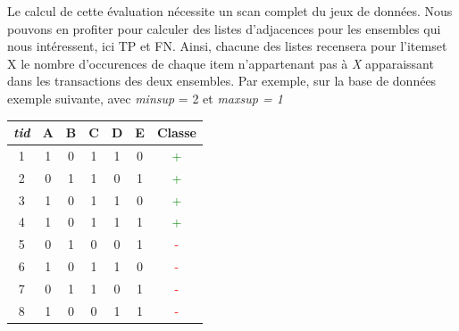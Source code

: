 \documentclass[a4paper,10pt]{report}
\begin{document}
Le calcul de cette évaluation nécessite un scan complet du jeux de données. Nous pouvons en profiter pour calculer des listes d'adjacences pour les ensembles qui nous intéressent, ici TP et FN. Ainsi, chacune des listes recensera pour l'itemset X le nombre d'occurences de chaque item n'appartenant pas à \emph{X} apparaissant dans les transactions des deux ensembles. Par exemple, sur la base de données exemple suivante, avec \emph{minsup} = 2 et \emph{maxsup = 1} \\
\begin{center}
	\begin{tabular}{|c|c|c|c|c|c|c|}
		\hline
		\emph{tid} & A & B & C & D & E & Classe \\
		\hline
		1 & 1 & 0 & 1 & 1 & 0 & \textcolor{green}{+}\\
		\hline
		2 & 0 & 1 & 1 & 0 & 1 & \textcolor{green}{+}\\
		\hline
		3 & 1 & 0 & 1 & 1 & 0 & \textcolor{green}{+}\\
		\hline
		4 & 1 & 0 & 1 & 1 & 1 & \textcolor{green}{+}\\
		\hline
		5 & 0 & 1 & 0 & 0 & 1 & \textcolor{red}{-}\\
		\hline
		6 & 1 & 0 & 1 & 1 & 0 & \textcolor{red}{-}\\
		\hline
		7 & 0 & 1 & 1 & 0 & 1 & \textcolor{red}{-}\\	
		\hline
		8 & 1 & 0 & 0 & 1 & 1 & \textcolor{red}{-}\\	
		\hline		
	\end{tabular}
\end{center}
\end{document}
